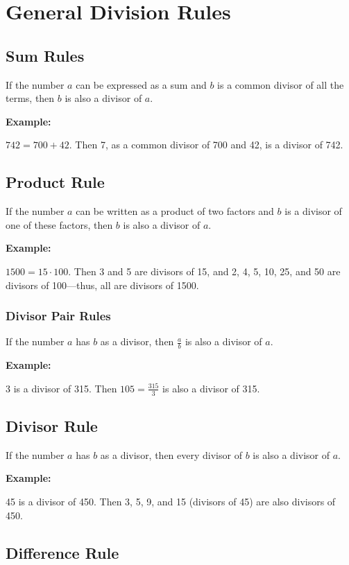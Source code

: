 \section{General Division Rules}

\subsection*{Sum Rules}

If the number \(a\) can be expressed as a sum and \(b\) is a common divisor of all the terms,
then \(b\) is also a divisor of \(a\).

\textbf{Example:}

\( 742 = 700 + 42 \). Then 7, as a common divisor of 700 and 42, is a divisor of 742.

\subsection*{Product Rule}

If the number \(a\) can be written as a product of two factors and \(b\) is a divisor of one of these factors, then \(b\) is also a divisor of \(a\).

\textbf{Example:}

\( 1500 = 15 \cdot 100 \). Then 3 and 5 are divisors of 15, and 2, 4, 5, 10, 25, and 50 are divisors of
100—thus, all are divisors of 1500.

\subsubsection*{Divisor Pair Rules}

If the number \(a\) has \(b\) as a divisor, then \( \frac{a}{b} \) is also a divisor of \(a\).

\textbf{Example:}

3 is a divisor of 315. Then \( 105 = \frac{315}{3} \) is also a divisor of 315.

\subsection*{Divisor Rule}

If the number \(a\) has \(b\) as a divisor, then every divisor of \(b\) is also a divisor of
\(a\).

\textbf{Example:}

45 is a divisor of 450. Then 3, 5, 9, and 15 (divisors of 45) are also divisors of 450.

\subsection*{Difference Rule}

